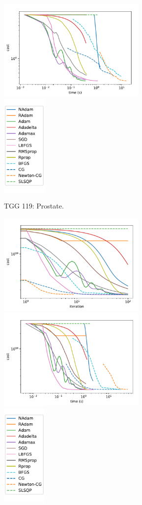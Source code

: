 \begin{figure}
\begin{subfigure}{\textwidth}
		\includegraphics[height=5cm]{optimizers_comparison/TGG119Prostate-time.pdf}
		\includegraphics[height=5cm]{optimizers_comparison/legend.pdf}
		\caption{TGG 119: Prostate.}
		\label{fig:TGG119_Prostate}
	\end{subfigure}
	\begin{subfigure}{\textwidth}
		\centering
		\includegraphics[height=5cm]{optimizers_comparison/ICMProstate-iter.pdf}
		\includegraphics[height=5cm]{optimizers_comparison/ICMProstate-time.pdf}
		\includegraphics[height=5cm]{optimizers_comparison/legend.pdf}

\end{subfigure}
\end{figure}
